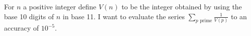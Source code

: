 For $n$ a positive integer define $V(n)$ to be the integer obtained by
using the base 10 digits of $n$ in base 11. I want to evaluate the
series
$\sum_{p \text{ prime}} \frac{1}{V(p)}$ to an accuracy of $10^{-5}$.
